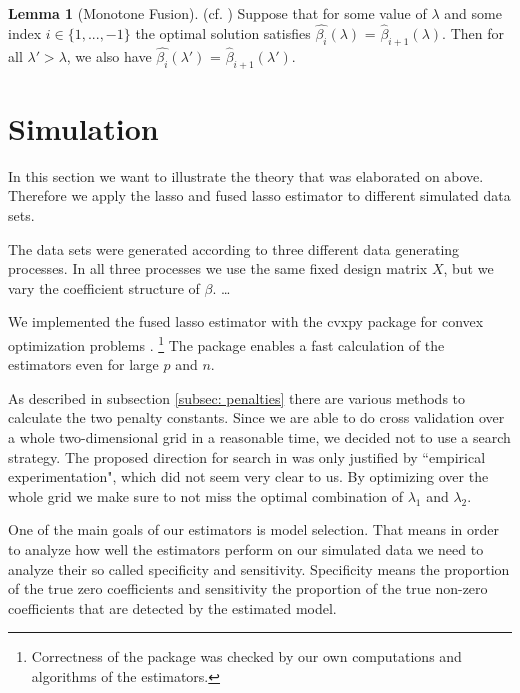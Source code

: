 \documentclass{article}
\theoremstyle{definition}
\newtheorem{lemma}[theorem]{Lemma}
\begin{document}
\begin{lemma}[Monotone Fusion] (cf. \citep{sparsity}) \label{monotone_fusion}
	Suppose that for some value of $\lambda$ and some index $i \in \{1, ..., -1 \}$ the optimal solution satisfies $\hat{\beta_i}(\lambda)$ = $\hat{\beta}_{i+1}(\lambda)$. Then for all $\lambda' > \lambda$, we also have $\hat{\beta_i}(\lambda')$ = $\hat{\beta}_{i+1}(\lambda')$.
\end{lemma}

\newpage
\section{Simulation}

In this section we want to illustrate the theory that was elaborated on above. Therefore we apply the lasso and fused lasso estimator to different simulated data sets.

The data sets were generated according to three different data generating processes. In all three processes we use the same fixed design matrix $X$, but we vary the coefficient structure of $\beta$. \ldots

We implemented the fused lasso estimator with the cvxpy package for convex optimization problems \citep{cvxpy}. \footnote{Correctness of the package was checked by our own computations and algorithms of the estimators.} The package enables a fast calculation of the estimators even for large $p$ and $n$.

As described in subsection \ref{subsec: penalties} there are various methods to calculate the two penalty constants. Since we are able to do cross validation over a whole two-dimensional grid in a reasonable time, we decided not to use a search strategy. The proposed direction for search in \citep{fused} was only justified by “empirical experimentation", which did not seem very clear to us. By optimizing over the whole grid we make sure to not miss the optimal combination of $\lambda_1$ and $\lambda_2$.

One of the main goals of our estimators is model selection. That means in order to analyze how well the estimators perform on our simulated data we need to analyze their so called specificity and sensitivity. Specificity means the proportion of the true zero coefficients and sensitivity the proportion of the true non-zero coefficients that are detected by the estimated model.
\end{document}

